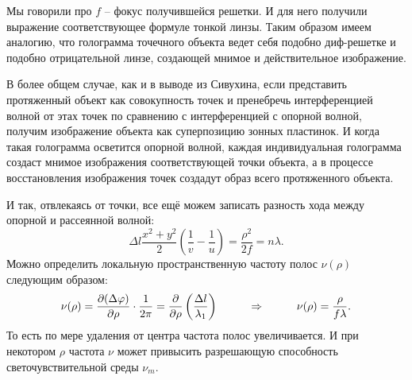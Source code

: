  Мы говорили про $f$ -- фокус получившейся решетки. И для него получили выражение соответствующее формуле тонкой линзы.
 Таким образом имеем аналогию, что голограмма точечного объекта ведет себя подобно диф-решетке и подобно отрицательной линзе, создающей мнимое и действительное изображение. 

В более общем случае, как и в выводе из Сивухина, если представить протяженный объект как совокупность точек и пренебречь интерференцией волной от этах точек по сравнению с интерференцией с опорной волной, получим изображение объекта как суперпозицию зонных пластинок. И когда такая голограмма осветится опорной волной, каждая индивидуальная голограмма создаст мнимое изображения соответствующей точки объекта, а в процессе восстановления изображения точек создадут образ всего протяженного объекта.

И так, отвлекаясь от точки, все ещё можем записать разность хода между опорной и рассеянной волной:
\begin{equation*}
	\Delta l \frac{x^2 + y^2}{2} \left(\frac{1}{v} - \frac{1}{u}\right) = \frac{\rho^2}{2 f} = n \lambda.
\end{equation*}
Можно определить локальную пространственную частоту полос $\nu(\rho)$ следующим образом:
\begin{equation*}
	\nu(\rho) = \frac{\partial (\Delta \varphi)}{\partial\rho} \cdot \frac{1}{2 \pi} = \frac{\partial}{\partial \rho} \left(\frac{\Delta l}{\lambda_1}\right)
	\hspace{1 cm}
	\Rightarrow
	\hspace{1 cm}
	\nu(\rho) = \frac{\rho}{f \lambda}.
\end{equation*}
То есть по мере удаления от центра частота полос увеличивается. И при некотором $\rho$ частота $\nu$ может привысить разрешающую способность светочувствительной среды $\nu_m$.


